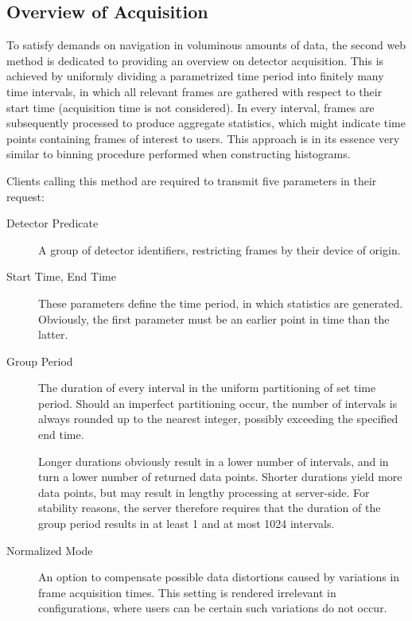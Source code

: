 \subsection{Overview of Acquisition}
To satisfy demands on navigation in voluminous amounts of data, the second web method is dedicated to providing an overview on detector acquisition. This is achieved by uniformly dividing a parametrized time period into finitely many time intervals, in which all relevant frames are gathered with respect to their start time (acquisition time is not considered). In every interval, frames are subsequently processed to produce aggregate statistics, which might indicate time points containing frames of interest to users. This approach is in its essence very similar to binning procedure performed when constructing histograms.

Clients calling this method are required to transmit five parameters in their request:

\begin{description}
	\item[Detector Predicate]
	A group of detector identifiers, restricting frames by their device of origin.

	\item[Start Time, End Time]
	These parameters define the time period, in which statistics are generated. Obviously, the first parameter must be an earlier point in time than the latter.

	\item[Group Period]
	The duration of every interval in the uniform partitioning of set time period. Should an imperfect partitioning occur, the number of intervals is always rounded up to the nearest integer, possibly exceeding the specified end time.

	Longer durations obviously result in a lower number of intervals, and in turn a lower number of returned data points. Shorter durations yield more data points, but may result in lengthy processing at server-side. For stability reasons, the server therefore requires that the duration of the group period results in at least 1 and at most 1024 intervals.

	\item[Normalized Mode]
	An option to compensate possible data distortions caused by variations in frame acquisition times. This setting is rendered irrelevant in configurations, where users can be certain such variations do not occur.
\end{description}

